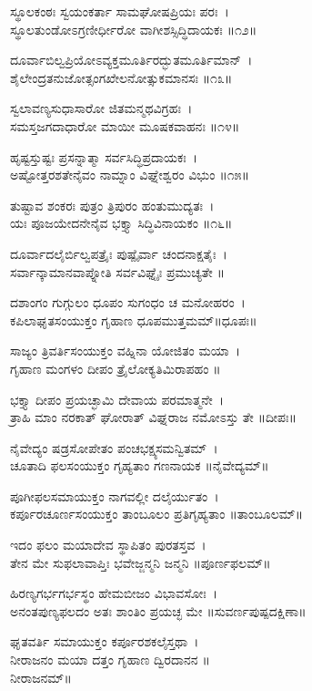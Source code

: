 ಸ್ಥೂಲಕಂಠಃ ಸ್ವಯಂಕರ್ತಾ ಸಾಮಘೋಷಪ್ರಿಯಃ ಪರಃ~।\\
ಸ್ಥೂಲತುಂಡೋಽಗ್ರಣೀರ್ಧೀರೋ ವಾಗೀಶಸ್ಸಿದ್ಧಿದಾಯಕಃ ॥೧೨॥

ದೂರ್ವಾಬಿಲ್ವಪ್ರಿಯೋಽವ್ಯಕ್ತಮೂರ್ತಿರದ್ಭುತಮೂರ್ತಿಮಾನ್~।\\
ಶೈಲೇಂದ್ರತನುಜೋತ್ಸಂಗಖೇಲನೋತ್ಸುಕಮಾನಸಃ ॥೧೩॥

ಸ್ವಲಾವಣ್ಯಸುಧಾಸಾರೋ ಜಿತಮನ್ಮಥವಿಗ್ರಹಃ~।\\
ಸಮಸ್ತಜಗದಾಧಾರೋ ಮಾಯೀ ಮೂಷಕವಾಹನಃ ॥೧೪॥

ಹೃಷ್ಟಸ್ತುಷ್ಟಃ ಪ್ರಸನ್ನಾತ್ಮಾ ಸರ್ವಸಿದ್ಧಿಪ್ರದಾಯಕಃ~।\\
ಅಷ್ಟೋತ್ತರಶತೇನೈವಂ ನಾಮ್ನಾಂ ವಿಘ್ನೇಶ್ವರಂ ವಿಭುಂ ॥೧೫॥

ತುಷ್ಟಾವ ಶಂಕರಃ ಪುತ್ರಂ ತ್ರಿಪುರಂ ಹಂತುಮುದ್ಯತಃ~।\\
ಯಃ ಪೂಜಯೇದನೇನೈವ ಭಕ್ತ್ಯಾ ಸಿದ್ಧಿವಿನಾಯಕಂ ॥೧೬॥

ದೂರ್ವಾದಲೈರ್ಬಿಲ್ವಪತ್ರೈಃ ಪುಷ್ಪೈರ್ವಾ ಚಂದನಾಕ್ಷತೈಃ~।\\
ಸರ್ವಾನ್ಕಾಮಾನವಾಪ್ನೋತಿ ಸರ್ವವಿಘ್ನೈಃ ಪ್ರಮುಚ್ಯತೇ ॥

ದಶಾಂಗಂ ಗುಗ್ಗುಲಂ ಧೂಪಂ ಸುಗಂಧಂ ಚ ಮನೋಹರಂ~।\\
ಕಪಿಲಾಘೃತಸಂಯುಕ್ತಂ ಗೃಹಾಣ ಧೂಪಮುತ್ತಮಮ್॥ಧೂಪಃ॥

ಸಾಜ್ಯಂ ತ್ರಿವರ್ತಿಸಂಯುಕ್ತಂ ವಹ್ನಿನಾ ಯೋಜಿತಂ ಮಯಾ~।\\
ಗೃಹಾಣ ಮಂಗಳಂ ದೀಪಂ ತ್ರೈಲೋಕ್ಯತಿಮಿರಾಪಹಂ ॥

ಭಕ್ತ್ಯಾ ದೀಪಂ ಪ್ರಯಚ್ಛಾಮಿ ದೇವಾಯ ಪರಮಾತ್ಮನೇ~।\\
ತ್ರಾಹಿ ಮಾಂ ನರಕಾತ್ ಘೋರಾತ್ ವಿಘ್ನರಾಜ ನಮೋಽಸ್ತು ತೇ ॥ದೀಪಃ॥

ನೈವೇದ್ಯಂ ಷಡ್ರಸೋಪೇತಂ ಪಂಚಭಕ್ಷ್ಯಸಮನ್ವಿತಮ್~।\\
ಚೂತಾದಿ ಫಲಸಂಯುಕ್ತಂ ಗೃಹ್ಯತಾಂ ಗಣನಾಯಕ ॥ನೈವೇದ್ಯಮ್॥

ಪೂಗೀಫಲಸಮಾಯುಕ್ತಂ ನಾಗವಲ್ಲೀ ದಲೈರ್ಯುತಂ~।\\
ಕರ್ಪೂರಚೂರ್ಣಸಂಯುಕ್ತಂ ತಾಂಬೂಲಂ ಪ್ರತಿಗೃಹ್ಯತಾಂ ॥ತಾಂಬೂಲಮ್॥

ಇದಂ ಫಲಂ ಮಯಾದೇವ ಸ್ಥಾಪಿತಂ ಪುರತಸ್ತವ~।\\
ತೇನ ಮೇ ಸುಫಲಾವಾಪ್ತಿಃ ಭವೇಜ್ಜನ್ಮನಿ ಜನ್ಮನಿ ॥ಪೂರ್ಣಫಲಮ್॥

ಹಿರಣ್ಯಗರ್ಭಗರ್ಭಸ್ಥಂ ಹೇಮಬೀಜಂ ವಿಭಾವಸೋಃ~।\\
ಅನಂತಪುಣ್ಯಫಲದಂ ಅತಃ ಶಾಂತಿಂ ಪ್ರಯಚ್ಛ ಮೇ ॥ಸುವರ್ಣಪುಷ್ಪದಕ್ಷಿಣಾ॥

ಘೃತವರ್ತಿ ಸಮಾಯುಕ್ತಂ ಕರ್ಪೂರಶಕಲೈಸ್ತಥಾ~।\\
ನೀರಾಜನಂ ಮಯಾ ದತ್ತಂ ಗೃಹಾಣ ದ್ವಿರದಾನನ ॥\\
ನೀರಾಜನಮ್॥

